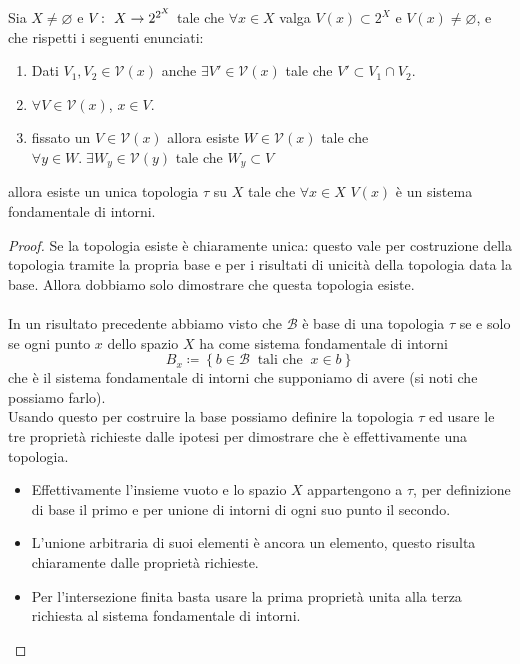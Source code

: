 \begin{theorem}
	\label{thr:sfi_generate_topology}
	Sia $X \neq \varnothing$ e $V \colon\ X \rightarrow 2^{2^X}$ tale che $\forall x \in X$ valga $V(x) \subset 2^X$ e $V(x) \neq \varnothing$, e che rispetti i seguenti enunciati:
	\begin{enumerate}
		\item Dati $V_1, V_2 \in \mathcal{V}(x)$ anche $\exists V' \in \mathcal{V}(x)$ tale che $V' \subset V_1 \cap V_2$.
		\item $\forall V \in \mathcal{V}(x)$, $x \in V$.
		\item fissato un $V \in \mathcal{V}(x)$ allora esiste $W \in \mathcal{V}(x)$ tale che $\forall y \in W.\; \exists W_y \in \mathcal{V}(y)$ tale che $W_y \subset V$
	\end{enumerate}
	allora esiste un unica topologia $\tau$ su $X$ tale che $\forall x \in X$ $V(x)$ è un sistema fondamentale di intorni. 
\end{theorem}
\begin{proof}
	Se la topologia esiste è chiaramente unica: questo vale per costruzione della topologia tramite la propria base e per i risultati di unicità della topologia data la base. Allora dobbiamo solo dimostrare che questa topologia esiste. \\ \\
	In un risultato precedente abbiamo visto che $\mathcal{B}$ è base di una topologia $\tau$ se e solo se ogni punto $x$ dello spazio $X$ ha come sistema fondamentale di intorni 
	\begin{equation*}
	B_x \coloneqq \left\{ b \in \mathcal{B} \ \text{ tali che } \ x \in b \right\}
	\end{equation*}
	che è il sistema fondamentale di intorni che supponiamo di avere (si noti che possiamo farlo). \\ Usando questo per costruire la base possiamo definire la topologia $\tau$ ed usare le tre proprietà richieste dalle ipotesi per dimostrare che è effettivamente una topologia.
	\begin{itemize}
		\item Effettivamente l'insieme vuoto e lo spazio $X$ appartengono a $\tau$, per definizione di base il primo e per unione di intorni di ogni suo punto il secondo.
		\item L'unione arbitraria di suoi elementi è ancora un elemento, questo risulta chiaramente dalle proprietà richieste.
		\item Per l'intersezione finita basta usare la prima proprietà unita alla terza richiesta al sistema fondamentale di intorni.
	\end{itemize}
\end{proof}



